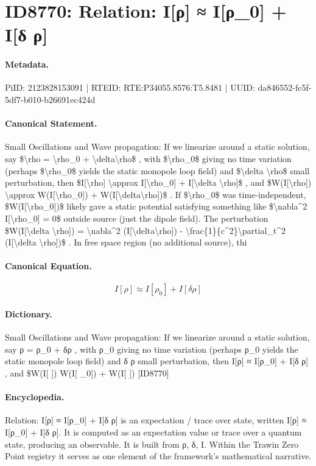\section*{ID8770: Relation: I[ρ] ≈ I[ρ\_0] + I[δ ρ]}
\paragraph{Metadata.}
PiID: 2123828153091 | RTEID: RTE:P34055.8576:T5.8481 | UUID: da846552-fc5f-5df7-b010-b26691ec424d

\paragraph{Canonical Statement.}
Small Oscillations and Wave propagation: If we linearize around a static solution, say \$\textbackslash{}rho = \textbackslash{}rho\_0 + \textbackslash{}delta\textbackslash{}rho\$ , with \$\textbackslash{}rho\_0\$ giving no time variation (perhaps \$\textbackslash{}rho\_0\$ yields the static monopole loop field) and \$\textbackslash{}delta \textbackslash{}rho\$ small perturbation, then \$I[\textbackslash{}rho] \textbackslash{}approx I[\textbackslash{}rho\_0] + I[\textbackslash{}delta \textbackslash{}rho]\$ , and \$W(I[\textbackslash{}rho]) \textbackslash{}approx W(I[\textbackslash{}rho\_0]) + W(I[\textbackslash{}delta\textbackslash{}rho])\$ . If \$\textbackslash{}rho\_0\$ was time-independent, \$W(I[\textbackslash{}rho\_0])\$ likely gave a static potential satisfying something like \$\textbackslash{}nabla\textasciicircum{}2 I[\textbackslash{}rho\_0] = 0\$ outside source (just the dipole field). The perturbation \$W(I[\textbackslash{}delta \textbackslash{}rho]) = \textbackslash{}nabla\textasciicircum{}2 (I[\textbackslash{}delta\textbackslash{}rho]) - \textbackslash{}frac\{1\}\{c\textasciicircum{}2\}\textbackslash{}partial\_t\textasciicircum{}2 (I[\textbackslash{}delta \textbackslash{}rho])\$ . In free space region (no additional source), thi

\paragraph{Canonical Equation.}
\[
I[\rho] \approx I[\rho_0] + I[\delta \rho]
\]

\paragraph{Dictionary.}
Small Oscillations and Wave propagation: If we linearize around a static solution, say ρ = ρ\_0 + δρ , with ρ\_0 giving no time variation (perhaps ρ\_0 yields the static monopole loop field) and δ ρ small perturbation, then I[ρ] ≈ I[ρ\_0] + I[δ ρ] , and \$W(I[ ]) W(I[ \_0]) + W(I[ ]) [ID8770]

\paragraph{Encyclopedia.}
Relation: I[ρ] ≈ I[ρ\_0] + I[δ ρ] is an expectation / trace over state, written I[ρ] ≈ I[ρ\_0] + I[δ ρ]. It is computed as an expectation value or trace over a quantum state, producing an observable. It is built from ρ, δ, I. Within the Trawin Zero Point registry it serves as one element of the framework's mathematical narrative.

